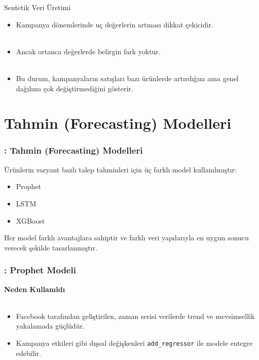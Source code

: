\documentclass[12pt]{beamer}
\begin{document}
\begin{frame}{Sentetik Veri Üretimi}
	\begin{itemize}
		\item Kampanya dönemlerinde uç değerlerin artması dikkat
		      çekicidir.
		      \\~\\
		\item  Ancak ortanca değerlerde belirgin fark yoktur.
		      \\~\\
		\item Bu durum, kampanyaların satışları bazı ürünlerde
		      artırdığını ama genel dağılımı çok değiştirmediğini gösterir.
	\end{itemize}
\end{frame}

\section{Tahmin (Forecasting) Modelleri}
\begin{frame}
	\frametitle{\insertsection: Tahmin (Forecasting) Modelleri}
	Ürünlerin varyant bazlı talep tahminleri için üç farklı model
	kullanılmıştır:
	\vspace{0.5cm}
	\begin{itemize}
		\item Prophet
		\item LSTM
		\item XGBoost
	\end{itemize}
	\vspace{0.5cm}
	Her model farklı avantajlara sahiptir ve farklı veri yapılarıyla en
	uygun sonucu verecek şekilde tasarlanmıştır.
\end{frame}

\begin{frame}
	\frametitle{\insertsection: Prophet Modeli}
	\textbf{Neden Kullanıldı} \\~\\
	\begin{itemize}
		\item Facebook tarafından geliştirilen, zaman serisi verilerde
		      trend ve mevsimsellik yakalamada güçlüdür.
		\item Kampanya etkileri gibi dışsal değişkenleri
		      \texttt{add\_regressor} ile modele entegre edebilir.
	\end{itemize}
\end{frame}
\end{document}
